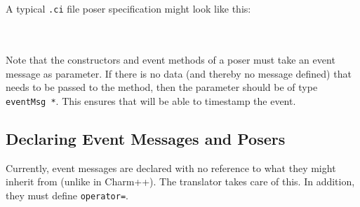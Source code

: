~\\
\\

A typical {\tt .ci} file poser specification might look like this:

~\\
\\

Note that the constructors and event methods of a poser must take an
event message as parameter.  If there is no data (and thereby no
message defined) that needs to be passed to the method, then the
parameter should be of type {\tt eventMsg *}.  This ensures that
\pose{} will be able to timestamp the event.

\subsection{Declaring Event Messages and Posers}

Currently, event messages are declared with no reference to what they
might inherit from (unlike in Charm++).  The translator takes care of
this. In addition, they must define {\tt operator=}.

~\\
\\

